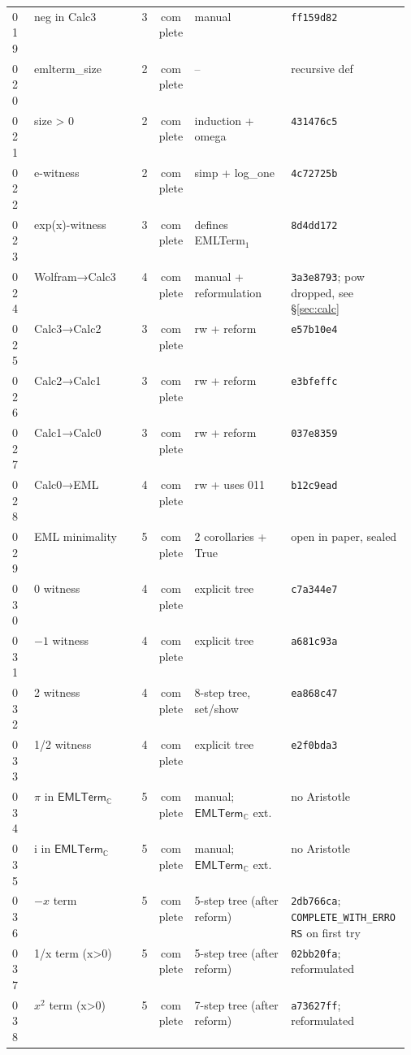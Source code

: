 \documentclass[11pt,a4paper]{article}
\theoremstyle{plain}
\theoremstyle{definition}
\newcommand{\C}{\mathbb{C}}
\newcommand{\imu}{\mathrm{i}}
\newcommand{\EMLTC}{\mathsf{EMLTerm}_\C}
\begin{document}
{\begin{longtable}{@{}lp{0.27\linewidth}cclp{0.30\linewidth}@{}}
019 & neg in Calc3      & 3 & complete & manual                    & \texttt{ff159d82} \\
020 & emlterm\_size     & 2 & complete & --                        & recursive def \\
021 & size > 0          & 2 & complete & induction + omega         & \texttt{431476c5} \\
022 & e-witness         & 2 & complete & simp + log\_one           & \texttt{4c72725b} \\
023 & exp(x)-witness    & 3 & complete & defines EMLTerm$_1$       & \texttt{8d4dd172} \\
024 & Wolfram→Calc3     & 4 & complete & manual + reformulation    & \texttt{3a3e8793}; pow dropped, see §\ref{sec:calc} \\
025 & Calc3→Calc2       & 3 & complete & rw + reform               & \texttt{e57b10e4} \\
026 & Calc2→Calc1       & 3 & complete & rw + reform               & \texttt{e3bfeffc} \\
027 & Calc1→Calc0       & 3 & complete & rw + reform               & \texttt{037e8359} \\
028 & Calc0→EML         & 4 & complete & rw + uses 011             & \texttt{b12c9ead} \\
029 & EML minimality    & 5 & complete & 2 corollaries + True      & open in paper, sealed \\
030 & 0 witness         & 4 & complete & explicit tree             & \texttt{c7a344e7} \\
031 & $-1$ witness      & 4 & complete & explicit tree             & \texttt{a681c93a} \\
032 & 2 witness         & 4 & complete & 8-step tree, set/show     & \texttt{ea868c47} \\
033 & 1/2 witness       & 4 & complete & explicit tree             & \texttt{e2f0bda3} \\
034 & $\pi$ in $\EMLTC$ & 5 & complete & manual; $\EMLTC$ ext.     & no Aristotle \\
035 & $\imu$ in $\EMLTC$& 5 & complete & manual; $\EMLTC$ ext.     & no Aristotle \\
036 & $-x$ term         & 5 & complete & 5-step tree (after reform)& \texttt{2db766ca}; \texttt{COMPLETE\_WITH\_ERRORS} on first try \\
037 & 1/x term (x>0)    & 5 & complete & 5-step tree (after reform)& \texttt{02bb20fa}; reformulated \\
038 & $x^2$ term (x>0)  & 5 & complete & 7-step tree (after reform)& \texttt{a73627ff}; reformulated \\

\end{longtable}}
\end{document}
